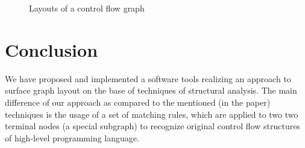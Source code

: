 \documentclass[conference]{IEEEtran}
\begin{document}
\begin{figure}[b]
\begin{minipage}[b]{0.49\linewidth}
	\end{minipage}
	\caption{Layouts of a control flow graph}
	\label{fig:image1}
\end{figure}


\section{Conclusion}
We have proposed and implemented a software tools realizing an approach to surface graph layout on the base of techniques of structural analysis.  The main difference of our approach as compared to the mentioned (in the paper) techniques is the usage of a set of matching rules, which are applied to two two terminal nodes (a special subgraph) to recognize original control flow structures of high-level programming language.
\end{document}
